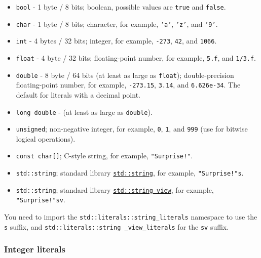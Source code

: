 \documentclass[table, xcdraw]{article}%
\begin{document}
\begin{itemize}[leftmargin=15pt,noitemsep,nolistsep]
\item \texttt{bool} - 1 byte / 8 bits; boolean, possible values are \texttt{true} and \texttt{false}.
\item \texttt{char} - 1 byte / 8 bits; character, for example, \texttt{'a'}, \texttt{'z'}, and \texttt{'9'}.
\item \texttt{int} - 4 bytes / 32 bits; integer, for example, \texttt{-273}, \texttt{42}, and \texttt{1066}.
\item \texttt{float} - 4 byte / 32 bits; floating-point number, for example, \texttt{5.f}, and \texttt{1/3.f}.
\item \texttt{double} - 8 byte / 64 bits (at least as large as \texttt{float}); double-precision floating-point number, for example, \texttt{-273.15}, \texttt{3.14}, and \texttt{6.626e-34}. The default for literals with a decimal point.
\item \texttt{long double} - (at least as large as \texttt{double}).
\item \texttt{unsigned}; non-negative integer, for example, \texttt{0}, \texttt{1}, and \texttt{999} (use for bitwise logical operations).
\item \texttt{const char[]}; C-style string, for example, \texttt{"Surprise!"}.
\item \texttt{std::string}; standard library \hyperref[string]{\texttt{std::string}}, for example, \texttt{"Surprise!"s}.
\item \texttt{std::string}; standard library \hyperref[string_view]{\texttt{std::string_view}}, for example, \texttt{"Surprise!"sv}.
\end{itemize}

You need to import the \texttt{std::literals::string_literals} namespace to use the \texttt{s} suffix, and \texttt{std::literals::string _view_literals} for the \texttt{sv} suffix.

\subsubsection{Integer literals}
\end{document}
